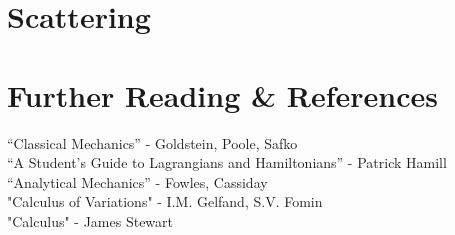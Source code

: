 \documentclass{article}
\begin{document}
%
%
\newpage
\section{Scattering}












%
%
\newpage
\section{Further Reading \& References}

\noindent
“Classical Mechanics” - Goldstein, Poole, Safko\\

\noindent
“A Student's Guide to Lagrangians and Hamiltonians” - Patrick Hamill\\

\noindent
“Analytical Mechanics” - Fowles, Cassiday\\

\noindent
"Calculus of Variations" - I.M. Gelfand, S.V. Fomin\\

\noindent
"Calculus" - James Stewart\\
\end{document}
